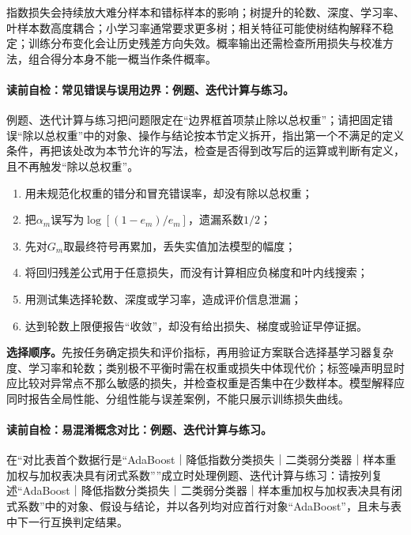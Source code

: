 \label{struct:V3-C03-CH30}
\begin{notapplicablebox}[title=\SLMethodLimitationsTitle]
指数损失会持续放大难分样本和错标样本的影响；树提升的轮数、深度、学习率、叶样本数高度耦合；小学习率通常要求更多树；相关特征可能使树结构解释不稳定；训练分布变化会让历史残差方向失效。概率输出还需检查所用损失与校准方法，组合得分本身不能一概当作条件概率。
\end{notapplicablebox}

\label{struct:V3-C03-CH31}
\paragraph{读前自检：常见错误与误用边界：例题、迭代计算与练习。}例题、迭代计算与练习把问题限定在“边界框首项禁止除以总权重”；请把固定错误“除以总权重”中的对象、操作与结论按本节定义拆开，指出第一个不满足的定义条件，再把该处改为本节允许的写法，检查是否得到改写后的运算或判断有定义，且不再触发“除以总权重”。\par

\begin{warningbox}
\begin{enumerate}[leftmargin=2.2em]
  \item 用未规范化权重的错分和冒充错误率，却没有除以总权重；
  \item 把$\alpha_m$误写为$\log[(1-e_m)/e_m]$，遗漏系数$1/2$；
  \item 先对$G_m$取最终符号再累加，丢失实值加法模型的幅度；
  \item 将回归残差公式用于任意损失，而没有计算相应负梯度和叶内线搜索；
  \item 用测试集选择轮数、深度或学习率，造成评价信息泄漏；
  \item 达到轮数上限便报告“收敛”，却没有给出损失、梯度或验证早停证据。
\end{enumerate}
\end{warningbox}

\label{struct:V3-C03-CH33}
\textbf{选择顺序。}先按任务确定损失和评价指标，再用验证方案联合选择基学习器复杂度、学习率和轮数；类别极不平衡时需在权重或损失中体现代价；标签噪声明显时应比较对异常点不那么敏感的损失，并检查权重是否集中在少数样本。模型解释应同时报告全局性能、分组性能与误差案例，不能只展示训练损失曲线。
\endgroup

\label{struct:V3-C03-CH32}
\paragraph{读前自检：易混淆概念对比：例题、迭代计算与练习。}在“对比表首个数据行是“AdaBoost｜降低指数分类损失｜二类弱分类器｜样本重加权与加权表决具有闭式系数””成立时处理例题、迭代计算与练习：请按列复述“AdaBoost｜降低指数分类损失｜二类弱分类器｜样本重加权与加权表决具有闭式系数”中的对象、假设与结论，并以各列均对应首行对象“AdaBoost”，且未与表中下一行互换判定结果。\par

